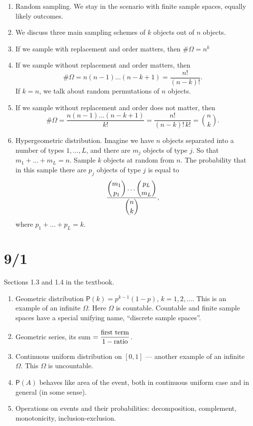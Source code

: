 \documentclass[letterpaper,11pt,oneside,reqno]{amsart}
\numberwithin{equation}{section}
\theoremstyle{definition}
\begin{document}
\begin{enumerate}
	\item Random sampling. We stay in the scenario with finite sample spaces, 
		equally likely outcomes. 
	\item 
		We discuss three main sampling schemes of $k$ objects out of $n$ objects.
	\item If we sample with replacement and order matters, then
		$\#\Omega=n^k$
	\item If we sample without replacement and order matters, then
		$$\#\Omega=n(n-1)\ldots(n-k+1)=\dfrac{n!}{(n-k)!}. $$
		If $k=n$, we talk about random permutations of $n$ objects.
	\item If we sample without replacement and order does not matter, then
		$$\#\Omega=\frac{n(n-1)\ldots(n-k+1)}{k!}=\dfrac{n!}{(n-k)!\,k!}=\binom nk .$$
	\item Hypergeometric distribution. Imagine we have $n$
		objects separated into a number of types
		$1,\ldots,L $, and there are $m_j$ objects
		of type $j$. So that $m_1+\ldots+m_L =n$.
		Sample $k$ objects at random from $n$.
		The probability that in this sample there 
		are $p_j$ objects of type $j$ is equal to 
		\begin{equation*}
			\frac{\dbinom{m_1}{p_1}\ldots\dbinom{p_L}{m_L} }{\dbinom nk},
		\end{equation*}
		where $p_1+\ldots+p_L=k $.

\end{enumerate}


\section{9/1}

Sections 1.3 and 1.4 in the textbook.

\begin{enumerate}
	\item Geometric distribution $\mathsf{P}(k)=p^{k-1}(1-p)$, $k=1,2,\ldots $.
		This is an example of an infinite $\Omega$. Here $\Omega$ is countable.
		Countable and finite sample spaces have a special unifying name,
		``discrete sample spaces''.

	\item Geometric series, its sum $=\dfrac{\textnormal{first term}}{1-\textnormal{ratio}}$.
	\item Continuous uniform distribution on $[0,1]$ --- another example of an infinite $\Omega$.
		This $\Omega$ is uncountable.
	\item $\mathsf{P}(A)$ behaves like area of the event, both in continuous uniform case
		and in general (in some sense).
	\item Operations on events and their probabilities: 
		decomposition, complement, monotonicity, inclusion-exclusion.
\end{enumerate}
\end{document}
